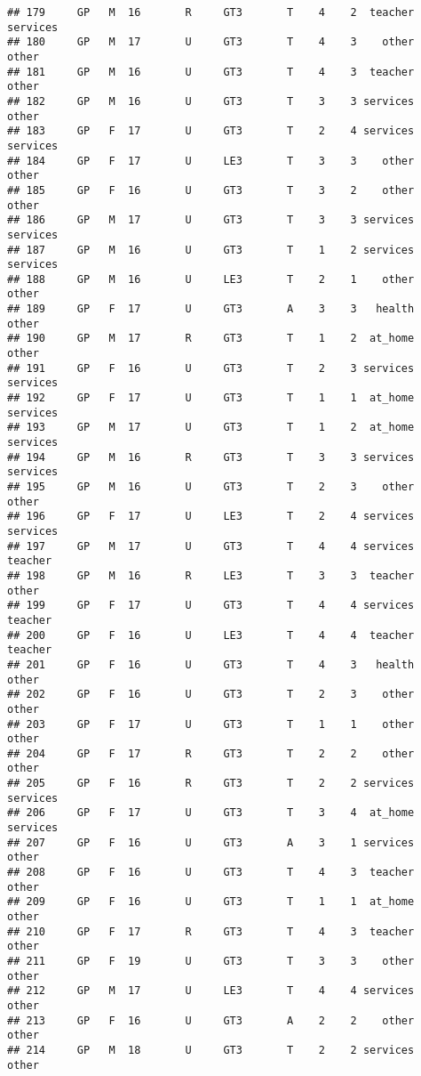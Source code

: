 \documentclass[
]{article}
\begin{document}
\begin{verbatim}
## 179     GP   M  16       R     GT3       T    4    2  teacher services
## 180     GP   M  17       U     GT3       T    4    3    other    other
## 181     GP   M  16       U     GT3       T    4    3  teacher    other
## 182     GP   M  16       U     GT3       T    3    3 services    other
## 183     GP   F  17       U     GT3       T    2    4 services services
## 184     GP   F  17       U     LE3       T    3    3    other    other
## 185     GP   F  16       U     GT3       T    3    2    other    other
## 186     GP   M  17       U     GT3       T    3    3 services services
## 187     GP   M  16       U     GT3       T    1    2 services services
## 188     GP   M  16       U     LE3       T    2    1    other    other
## 189     GP   F  17       U     GT3       A    3    3   health    other
## 190     GP   M  17       R     GT3       T    1    2  at_home    other
## 191     GP   F  16       U     GT3       T    2    3 services services
## 192     GP   F  17       U     GT3       T    1    1  at_home services
## 193     GP   M  17       U     GT3       T    1    2  at_home services
## 194     GP   M  16       R     GT3       T    3    3 services services
## 195     GP   M  16       U     GT3       T    2    3    other    other
## 196     GP   F  17       U     LE3       T    2    4 services services
## 197     GP   M  17       U     GT3       T    4    4 services  teacher
## 198     GP   M  16       R     LE3       T    3    3  teacher    other
## 199     GP   F  17       U     GT3       T    4    4 services  teacher
## 200     GP   F  16       U     LE3       T    4    4  teacher  teacher
## 201     GP   F  16       U     GT3       T    4    3   health    other
## 202     GP   F  16       U     GT3       T    2    3    other    other
## 203     GP   F  17       U     GT3       T    1    1    other    other
## 204     GP   F  17       R     GT3       T    2    2    other    other
## 205     GP   F  16       R     GT3       T    2    2 services services
## 206     GP   F  17       U     GT3       T    3    4  at_home services
## 207     GP   F  16       U     GT3       A    3    1 services    other
## 208     GP   F  16       U     GT3       T    4    3  teacher    other
## 209     GP   F  16       U     GT3       T    1    1  at_home    other
## 210     GP   F  17       R     GT3       T    4    3  teacher    other
## 211     GP   F  19       U     GT3       T    3    3    other    other
## 212     GP   M  17       U     LE3       T    4    4 services    other
## 213     GP   F  16       U     GT3       A    2    2    other    other
## 214     GP   M  18       U     GT3       T    2    2 services    other

\end{verbatim}
\end{document}
